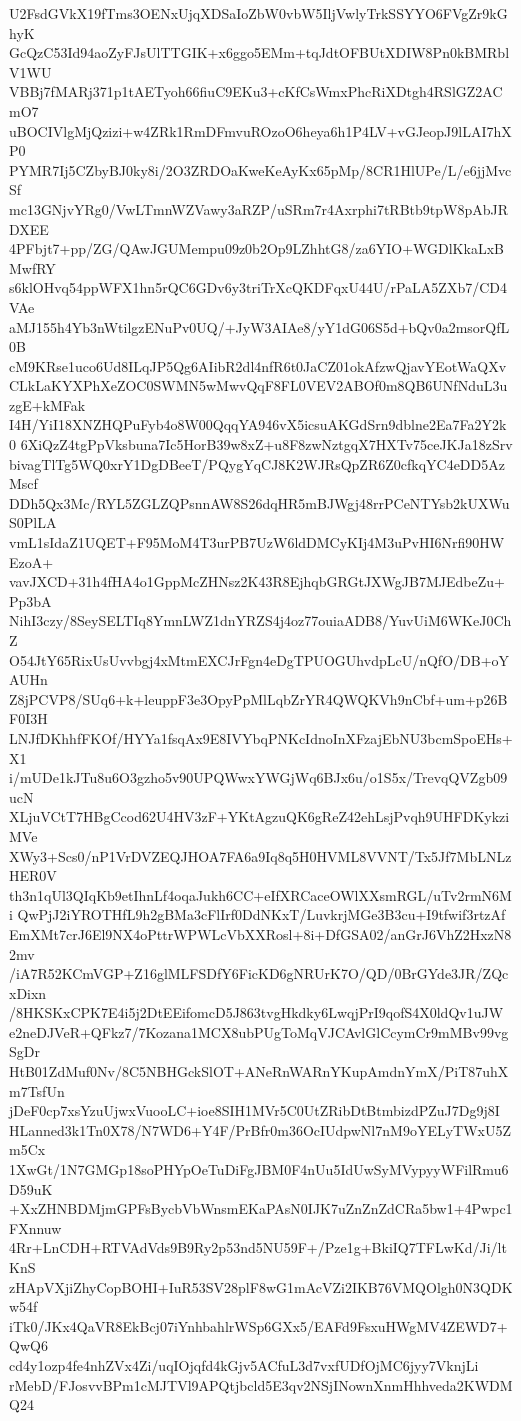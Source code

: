 U2FsdGVkX19fTms3OENxUjqXDSaIoZbW0vbW5IljVwlyTrkSSYYO6FVgZr9kGhyK
GcQzC53Id94aoZyFJsUlTTGIK+x6ggo5EMm+tqJdtOFBUtXDIW8Pn0kBMRblV1WU
VBBj7fMARj371p1tAETyoh66fiuC9EKu3+cKfCsWmxPhcRiXDtgh4RSlGZ2ACmO7
uBOCIVlgMjQzizi+w4ZRk1RmDFmvuROzoO6heya6h1P4LV+vGJeopJ9lLAI7hXP0
PYMR7Ij5CZbyBJ0ky8i/2O3ZRDOaKweKeAyKx65pMp/8CR1HlUPe/L/e6jjMvcSf
mc13GNjvYRg0/VwLTmnWZVawy3aRZP/uSRm7r4Axrphi7tRBtb9tpW8pAbJRDXEE
4PFbjt7+pp/ZG/QAwJGUMempu09z0b2Op9LZhhtG8/za6YIO+WGDlKkaLxBMwfRY
s6klOHvq54ppWFX1hn5rQC6GDv6y3triTrXcQKDFqxU44U/rPaLA5ZXb7/CD4VAe
aMJ155h4Yb3nWtilgzENuPv0UQ/+JyW3AIAe8/yY1dG06S5d+bQv0a2msorQfL0B
cM9KRse1uco6Ud8ILqJP5Qg6AIibR2dl4nfR6t0JaCZ01okAfzwQjavYEotWaQXv
CLkLaKYXPhXeZOC0SWMN5wMwvQqF8FL0VEV2ABOf0m8QB6UNfNduL3uzgE+kMFak
I4H/YiI18XNZHQPuFyb4o8W00QqqYA946vX5icsuAKGdSrn9dblne2Ea7Fa2Y2k0
6XiQzZ4tgPpVksbuna7Ic5HorB39w8xZ+u8F8zwNztgqX7HXTv75ceJKJa18zSrv
bivagTlTg5WQ0xrY1DgDBeeT/PQygYqCJ8K2WJRsQpZR6Z0cfkqYC4eDD5AzMscf
DDh5Qx3Mc/RYL5ZGLZQPsnnAW8S26dqHR5mBJWgj48rrPCeNTYsb2kUXWuS0PlLA
vmL1sIdaZ1UQET+F95MoM4T3urPB7UzW6ldDMCyKIj4M3uPvHI6Nrfi90HWEzoA+
vavJXCD+31h4fHA4o1GppMcZHNsz2K43R8EjhqbGRGtJXWgJB7MJEdbeZu+Pp3bA
NihI3czy/8SeySELTIq8YmnLWZ1dnYRZS4j4oz77ouiaADB8/YuvUiM6WKeJ0ChZ
O54JtY65RixUsUvvbgj4xMtmEXCJrFgn4eDgTPUOGUhvdpLcU/nQfO/DB+oYAUHn
Z8jPCVP8/SUq6+k+leuppF3e3OpyPpMlLqbZrYR4QWQKVh9nCbf+um+p26BF0I3H
LNJfDKhhfFKOf/HYYa1fsqAx9E8IVYbqPNKcIdnoInXFzajEbNU3bcmSpoEHs+X1
i/mUDe1kJTu8u6O3gzho5v90UPQWwxYWGjWq6BJx6u/o1S5x/TrevqQVZgb09ucN
XLjuVCtT7HBgCcod62U4HV3zF+YKtAgzuQK6gReZ42ehLsjPvqh9UHFDKykziMVe
XWy3+Scs0/nP1VrDVZEQJHOA7FA6a9Iq8q5H0HVML8VVNT/Tx5Jf7MbLNLzHER0V
th3n1qUl3QIqKb9etIhnLf4oqaJukh6CC+eIfXRCaceOWlXXsmRGL/uTv2rmN6Mi
QwPjJ2iYROTHfL9h2gBMa3cFlIrf0DdNKxT/LuvkrjMGe3B3cu+I9tfwif3rtzAf
EmXMt7crJ6El9NX4oPttrWPWLcVbXXRosl+8i+DfGSA02/anGrJ6VhZ2HxzN82mv
/iA7R52KCmVGP+Z16glMLFSDfY6FicKD6gNRUrK7O/QD/0BrGYde3JR/ZQcxDixn
/8HKSKxCPK7E4i5j2DtEEifomcD5J863tvgHkdky6LwqjPrI9qofS4X0ldQv1uJW
e2neDJVeR+QFkz7/7Kozana1MCX8ubPUgToMqVJCAvlGlCcymCr9mMBv99vgSgDr
HtB01ZdMuf0Nv/8C5NBHGckSlOT+ANeRnWARnYKupAmdnYmX/PiT87uhXm7TsfUn
jDeF0cp7xsYzuUjwxVuooLC+ioe8SIH1MVr5C0UtZRibDtBtmbizdPZuJ7Dg9j8I
HLanned3k1Tn0X78/N7WD6+Y4F/PrBfr0m36OcIUdpwNl7nM9oYELyTWxU5Zm5Cx
1XwGt/1N7GMGp18soPHYpOeTuDiFgJBM0F4nUu5IdUwSyMVypyyWFilRmu6D59uK
+XxZHNBDMjmGPFsBycbVbWnsmEKaPAsN0IJK7uZnZnZdCRa5bw1+4Pwpc1FXnnuw
4Rr+LnCDH+RTVAdVds9B9Ry2p53nd5NU59F+/Pze1g+BkiIQ7TFLwKd/Ji/ltKnS
zHApVXjiZhyCopBOHI+IuR53SV28plF8wG1mAcVZi2IKB76VMQOlgh0N3QDKw54f
iTk0/JKx4QaVR8EkBcj07iYnhbahlrWSp6GXx5/EAFd9FsxuHWgMV4ZEWD7+QwQ6
cd4y1ozp4fe4nhZVx4Zi/uqIOjqfd4kGjv5ACfuL3d7vxfUDfOjMC6jyy7VknjLi
rMebD/FJosvvBPm1cMJTVl9APQtjbcld5E3qv2NSjINownXnmHhhveda2KWDMQ24
